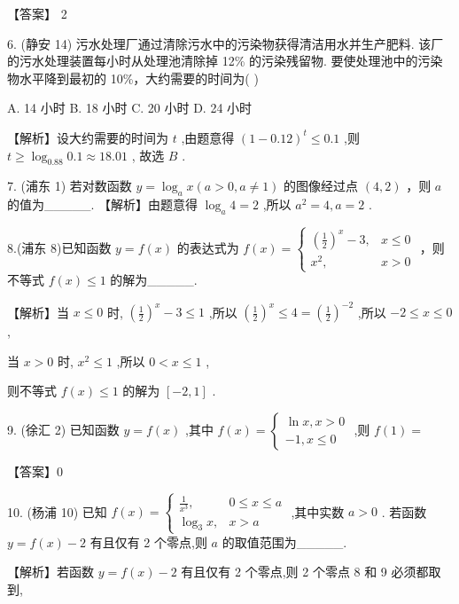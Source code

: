 \documentclass[10pt]{article}
\begin{document}
【答案】 2

6. (静安 14) 污水处理厂通过清除污水中的污染物获得清洁用水并生产肥料. 该厂的污水处理装置每小时从处理池清除掉 12\% 的污染残留物. 要使处理池中的污染物水平降到最初的 10\%，大约需要的时间为( )

A. 14 小时 B. 18 小时 C. 20 小时 D. 24 小时

【解析】设大约需要的时间为 \(t\) ,由题意得 \({\left( 1 - {0.12}\right) }^{t} \leq  {0.1}\) ,则 \(t \geq  {\log }_{0.88}{0.1} \approx  {18.01}\) , 故选 \(B\) .

7. (浦东 1) 若对数函数 \(y = {\log }_{a}x\left( {a > 0,a \neq  1}\right)\) 的图像经过点 \(\left( {4,2}\right)\) ，则 \(a\) 的值为\_\_\_\_\_. 【解析】由题意得 \({\log }_{a}4 = 2\) ,所以 \({a}^{2} = 4,a = 2\) .

8.(浦东 8)已知函数 \(y = f\left( x\right)\) 的表达式为 \(f\left( x\right)  = \left\{  \begin{matrix} {\left( \frac{1}{2}\right) }^{x} - 3, & x \leq  0 \\  {x}^{2}, & x > 0 \end{matrix}\right.\) ，则不等式 \(f\left( x\right)  \leq  1\) 的解为\_\_\_\_\_.

【解析】当 \(x \leq  0\) 时, \({\left( \frac{1}{2}\right) }^{x} - 3 \leq  1\) ,所以 \({\left( \frac{1}{2}\right) }^{x} \leq  4 = {\left( \frac{1}{2}\right) }^{-2}\) ,所以 \(- 2 \leq  x \leq  0\) ,

当 \(x > 0\) 时, \({x}^{2} \leq  1\) ,所以 \(0 < x \leq  1\) ,

则不等式 \(f\left( x\right)  \leq  1\) 的解为 \(\left\lbrack  {-2,1}\right\rbrack\) .

9. (徐汇 2) 已知函数 \(y = f\left( x\right)\) ,其中 \(f\left( x\right)  = \left\{  \begin{array}{l} \ln x,x > 0 \\   - 1,x \leq  0 \end{array}\right.\) ,则 \(f\left( 1\right)  =\)

【答案】0

10. (杨浦 10) 已知 \(f\left( x\right)  = \left\{  \begin{matrix} \frac{1}{{x}^{3}}, & 0 \leq  x \leq  a \\  {\log }_{3}x, & x > a \end{matrix}\right.\) ,其中实数 \(a > 0\) . 若函数 \(y = f\left( x\right)  - 2\) 有且仅有 2 个零点,则 \(a\) 的取值范围为\_\_\_\_\_.

【解析】若函数 \(y = f\left( x\right)  - 2\) 有且仅有 2 个零点,则 2 个零点 8 和 9 必须都取到,
\end{document}

